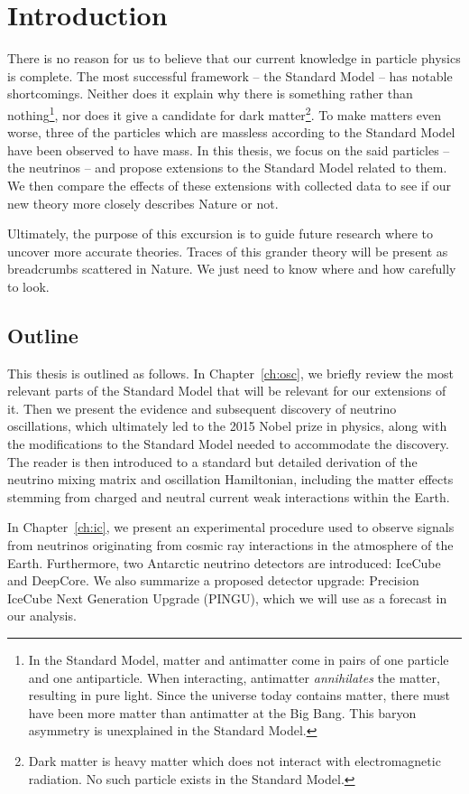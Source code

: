 \chapter{Introduction}
There is no reason for us to believe that our current knowledge in particle physics is complete.
The most successful framework -- the Standard Model -- has notable shortcomings. Neither does it
explain why there is something rather than nothing\footnote{In the Standard Model,
matter and antimatter come in pairs of one particle and one antiparticle. When interacting,
antimatter \emph{annihilates} the matter, resulting in pure light. Since the universe today contains matter,
there must have been more matter than antimatter at the Big Bang. This baryon asymmetry is unexplained in the Standard 
Model.}, nor does it give a candidate for dark matter\footnote{Dark matter is heavy matter which does not interact with electromagnetic radiation.
No such particle exists in the Standard Model.}.
To make matters even worse, three of the particles which are massless according to the Standard Model have been observed to have mass.
In this thesis, we focus on the said particles -- the neutrinos -- and propose extensions to the Standard Model related to them. 
We then compare the effects of these extensions with collected data to see if our new theory more closely describes Nature or not. 

Ultimately, the purpose of this excursion is to guide future research where to uncover more accurate theories.
Traces of this grander theory will be present as breadcrumbs scattered in Nature. We just need to know where and how carefully to look. 

\section{Outline}
This thesis is outlined as follows. In Chapter~\ref{ch:osc}, we briefly review the most relevant parts of the Standard Model that will be relevant for our extensions of it.
Then we present the evidence and subsequent discovery of neutrino oscillations, which ultimately led to the 2015 Nobel prize in physics, along with the modifications to the Standard Model needed to accommodate the discovery.
The reader is then introduced to a standard but detailed derivation of the neutrino mixing matrix and oscillation Hamiltonian, including the matter effects stemming from charged and neutral current weak interactions within the Earth.

In Chapter~\ref{ch:ic}, we present an experimental procedure used to observe signals from neutrinos originating from cosmic ray interactions in the atmosphere of the Earth. 
Furthermore, two Antarctic neutrino detectors are introduced: IceCube and DeepCore.
We also summarize a proposed detector upgrade: Precision IceCube Next Generation Upgrade (PINGU), which we will use as a forecast in our analysis.

